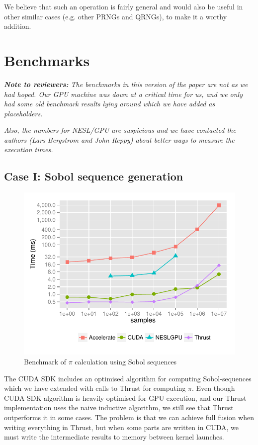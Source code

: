 \documentclass[preprint]{sigplanconf}
\begin{document}
We believe that such an operation is fairly general and would also be
useful in other similar cases (e.g. other PRNGs and QRNGs), to make it
a worthy addition.


\section{Benchmarks}
\emph{\textbf{Note to reviewers:} The benchmarks in this version of
  the paper are not as we had hoped. Our GPU machine was down at a
  critical time for us, and we only had some old benchmark results
  lying around which we have added as placeholders.} 

\emph{Also, the numbers
  for NESL/GPU are suspicious and we have contacted the authors (Lars
  Bergstrom and John Reppy) about better ways to measure the execution
  times.}

\subsection{Case I: Sobol sequence generation}
\begin{figure}
  \centering
  \includegraphics[width=\columnwidth]{figures/sobol-time-graph.pdf}
  \caption{Benchmark of $\pi$ calculation using Sobol sequences}
  \label{fig:bench_sobol}
\end{figure}

The CUDA SDK includes an optimised algorithm for computing
Sobol-sequences which we have extended with calls to Thrust for
computing $\pi$. Even though CUDA SDK algorithm is heavily optimised
for GPU execution, and our Thrust implementation uses the naive
inductive algorithm, we still see that Thrust outperforms it in some
cases. The problem is that we can achieve full fusion when writing
everything in Thrust, but when some parts are written in CUDA, we must
write the intermediate results to memory between kernel launches.
\end{document}
